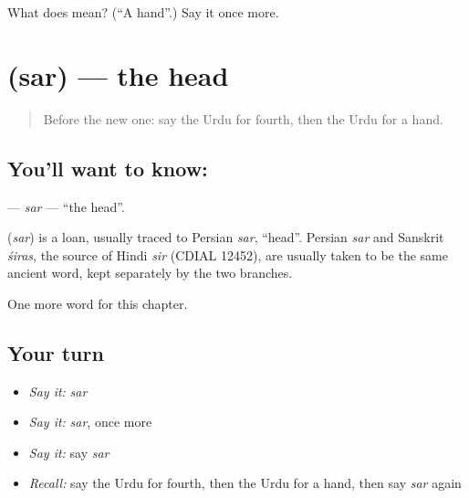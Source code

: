 \begin{tcolorbox}[breakable,colback=teal!4,colframe=teal!35!black,title={Before you move on}]
What does  mean? (\textquotedblleft{}A hand\textquotedblright{}.) Say it once more.
\end{tcolorbox}
\section[\texorpdfstring{\ur{سر} (sar)}{سر (sar)}]{ (sar) — the head}

\label{lesson:UR-C38-sar}



\begin{quote}
Before the new one: say the Urdu for fourth, then the Urdu for a hand.
\end{quote}

\subsection*{You'll want to know: }
\textbf{} — \emph{sar} — \textquotedblleft{}the head\textquotedblright{}.

\begin{cousinweb}
\textbf{} (\emph{sar}) is a loan, usually traced to Persian \emph{sar}, \textquotedblleft{}head\textquotedblright{}. Persian \emph{sar} and Sanskrit \emph{śiras}, the source of Hindi \emph{sir} (CDIAL 12452), are usually taken to be the same ancient word, kept separately by the two branches.
\end{cousinweb}

\begin{grammarlens}[title={What you've built}]
One more word for this chapter.
\end{grammarlens}

\subsection*{Your turn}
\begin{itemize}
\raggedright
  \item \emph{Say it:} \emph{sar}
  \item \emph{Say it:} \emph{sar}, once more
  \item \emph{Say it:} say \emph{sar}
  \item \emph{Recall:} say the Urdu for fourth, then the Urdu for a hand, then say \emph{sar} again
\end{itemize}

